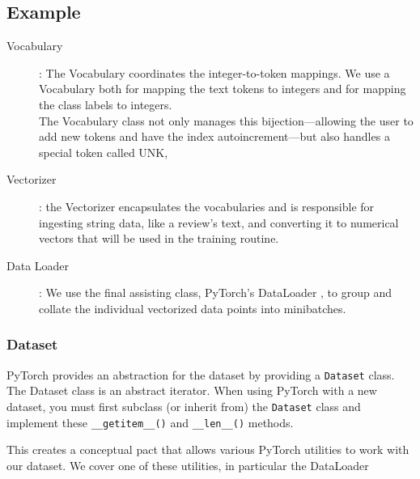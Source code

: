 \documentclass[french]{article}
\begin{document}
\subsection{Example}

\begin{description}
    \item[Vocabulary]: The Vocabulary coordinates the integer-to-token mappings. We use a Vocabulary both for mapping the text tokens to integers and for mapping the class labels to integers.\\
        The Vocabulary class not only manages this bijection—allowing the user to add new tokens and have the index autoincrement—but also handles a special token called UNK,

    \item[Vectorizer]: the Vectorizer encapsulates the vocabularies and is responsible for ingesting string data, like a review’s text, and converting it to numerical vectors that will be used in the training routine.
    \item[Data Loader]: We use the final assisting class, PyTorch’s DataLoader , to group and collate the individual vectorized data points into minibatches.
\end{description}

\subsubsection{Dataset}
PyTorch provides an abstraction for the dataset by providing a \verb|Dataset| class. The Dataset class is an abstract iterator. When using PyTorch with a new dataset, you must first subclass (or inherit from) the \verb|Dataset| class and implement these \verb|__getitem__()| and \verb|__len__()| methods.

This creates a conceptual pact that allows various PyTorch utilities to work with our dataset. We cover one of these utilities, in particular the DataLoader
\end{document}
